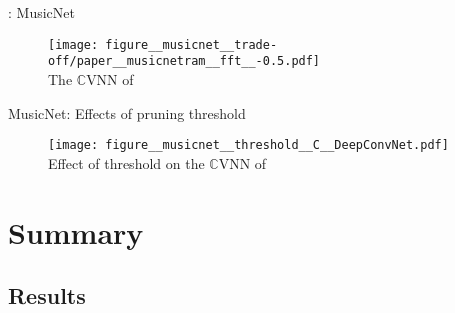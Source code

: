 \documentclass[handout]{beamer}
\newcommand{\real}{\mathbb{R}}
\newcommand{\cplx}{\mathbb{C}}
\begin{document}
\begin{frame}[c]{\insertsection: MusicNet}
  \begin{figure}[t]
    \centering
    \texttt{[image: figure\_\_musicnet\_\_trade-off/paper\_\_musicnetram\_\_fft\_\_-0.5.pdf]}
    \\
    {The $\cplx$VNN of \citet{trabelsi_deep_2018}}
  \end{figure}


\end{frame}

\begin{frame}[c]{MusicNet: Effects of pruning threshold}
  \begin{figure}[t]
    \centering
    \texttt{[image: figure\_\_musicnet\_\_threshold\_\_C\_\_DeepConvNet.pdf]}
    \\
    {Effect of threshold on the $\cplx$VNN of \citet{trabelsi_deep_2018}}
  \end{figure}

\end{frame}


\section{Summary} %
\label{sec:summary}

\subsection{Results} %
\label{sub:results}
\end{document}
